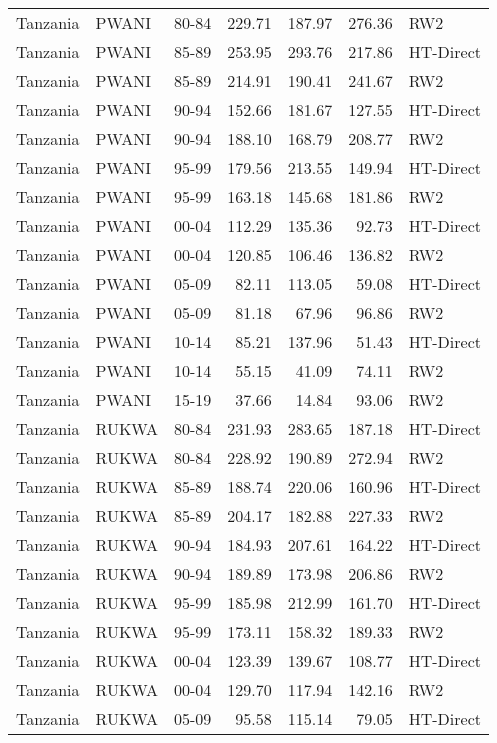 \begin{longtable}{lllrrrl}
  Tanzania & PWANI & 80-84 & 229.71 & 187.97 & 276.36 & RW2 \\ 
  Tanzania & PWANI & 85-89 & 253.95 & 293.76 & 217.86 & HT-Direct \\ 
  Tanzania & PWANI & 85-89 & 214.91 & 190.41 & 241.67 & RW2 \\ 
  Tanzania & PWANI & 90-94 & 152.66 & 181.67 & 127.55 & HT-Direct \\ 
  Tanzania & PWANI & 90-94 & 188.10 & 168.79 & 208.77 & RW2 \\ 
  Tanzania & PWANI & 95-99 & 179.56 & 213.55 & 149.94 & HT-Direct \\ 
  Tanzania & PWANI & 95-99 & 163.18 & 145.68 & 181.86 & RW2 \\ 
  Tanzania & PWANI & 00-04 & 112.29 & 135.36 & 92.73 & HT-Direct \\ 
  Tanzania & PWANI & 00-04 & 120.85 & 106.46 & 136.82 & RW2 \\ 
  Tanzania & PWANI & 05-09 & 82.11 & 113.05 & 59.08 & HT-Direct \\ 
  Tanzania & PWANI & 05-09 & 81.18 & 67.96 & 96.86 & RW2 \\ 
  Tanzania & PWANI & 10-14 & 85.21 & 137.96 & 51.43 & HT-Direct \\ 
  Tanzania & PWANI & 10-14 & 55.15 & 41.09 & 74.11 & RW2 \\ 
  Tanzania & PWANI & 15-19 & 37.66 & 14.84 & 93.06 & RW2 \\ 
  Tanzania & RUKWA & 80-84 & 231.93 & 283.65 & 187.18 & HT-Direct \\ 
  Tanzania & RUKWA & 80-84 & 228.92 & 190.89 & 272.94 & RW2 \\ 
  Tanzania & RUKWA & 85-89 & 188.74 & 220.06 & 160.96 & HT-Direct \\ 
  Tanzania & RUKWA & 85-89 & 204.17 & 182.88 & 227.33 & RW2 \\ 
  Tanzania & RUKWA & 90-94 & 184.93 & 207.61 & 164.22 & HT-Direct \\ 
  Tanzania & RUKWA & 90-94 & 189.89 & 173.98 & 206.86 & RW2 \\ 
  Tanzania & RUKWA & 95-99 & 185.98 & 212.99 & 161.70 & HT-Direct \\ 
  Tanzania & RUKWA & 95-99 & 173.11 & 158.32 & 189.33 & RW2 \\ 
  Tanzania & RUKWA & 00-04 & 123.39 & 139.67 & 108.77 & HT-Direct \\ 
  Tanzania & RUKWA & 00-04 & 129.70 & 117.94 & 142.16 & RW2 \\ 
  Tanzania & RUKWA & 05-09 & 95.58 & 115.14 & 79.05 & HT-Direct \\ 

\end{longtable}
